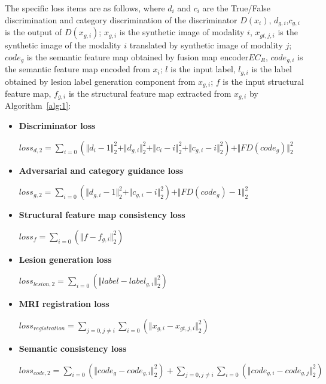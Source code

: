 \documentclass[letterpaper]{article} %
\begin{document}
The specific loss items are as follows, where $d_{i}$ and $c_{i}$ are the True/False discrimination and category discrimination of the discriminator $D(x_i)$, $d_{g, i}$,$c_{g,i}$ is the output of $D(x_{g,i})$; $x_{g,i}$ is the synthetic image of modality $i$, $x_{gt,j,i}$ is the synthetic image of the modality $i$ translated by synthetic image of modality $j$; $code_g$ is the semantic feature map obtained by fusion map encoder$EC_R$, $code_{g,i}$ is the semantic feature map encoded from $x_i$; $l$ is the input label, $l_{g,i}$ is the label obtained by lesion label generation component from $x_{g,i}$; $f$ is the input structural feature map, $f_{g,i}$ is the structural feature map extracted from $x_{g,i}$ by Algorithm~\ref{alg:1}:
\begin{itemize}
	\item \textbf{Discriminator loss }
	\begin{center}
		$loss_{d,2}=\sum\limits_{i=0}(\Vert{d_{i}-1}\Vert_{2}^{2}+\Vert{d_{g,i}}\Vert_{2}^{2}+\Vert{c_{i}-i}\Vert_{2}^{2}+\Vert{c_{g,i}-i}\Vert_{2}^{2})+\Vert{FD(code_{g})}\Vert_{2}^{2}$
	\end{center}

	\item \textbf{Adversarial and category guidance loss}
	\begin{center}
		$loss_{g,2}=\sum\limits_{i=0}(\Vert{d_{g,i}-1}\Vert_{2}^{2}+\Vert{c_{g,i}-i}\Vert_{2}^{2})+\Vert{FD(code_{g})-1}\Vert_{2}^{2}$
	\end{center}
	
	\item \textbf{Structural feature map consistency loss}
	\begin{center}
		$loss_{f}=\sum\limits_{i=0}(\Vert{f-f_{g,i}}\Vert_{2}^{2})$
	\end{center}
	
	\item \textbf{Lesion generation loss}
	\begin{center}
		$loss_{lesion,2}=\sum\limits_{i=0}(\Vert{label-label_{g,i}}\Vert_{2}^{2})$
	\end{center}
	
	\item \textbf{MRI registration loss}
	\begin{center}
		$loss_{registration}=\sum\limits_{j=0,j\neq i}\sum\limits_{i=0}(\Vert{x_{g,i}-x_{gt,j,i}}\Vert_{2}^{2})$
	\end{center}
	
	\item \textbf{Semantic consistency loss}
	\begin{center}
		$loss_{code,2}=\sum\limits_{i=0}(\Vert{code_g-code_{g,i}}\Vert_{2}^{2})+\sum\limits_{j=0,j\neq i}\sum\limits_{i=0}(\Vert{code_{g,i}-code_{g,j}}\Vert_{2}^{2})$
	\end{center}
	
\end{itemize}
\end{document}
